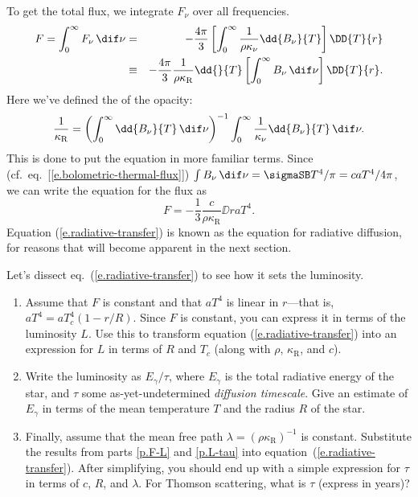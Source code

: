 To get the total flux, we integrate $F_{\nu}$ over all frequencies. 
\begin{eqnarray*}
	F = \int_{0}^{\infty}F_{\nu}\,\dif\nu &=& -\frac{4\pi}{3} \left[\int_{0}^{\infty} \frac{1}{\rho\kappa_{\nu}}\dd{B_{\nu}}{T}\right]\DD{T}{r}\\
	&\equiv& -\frac{4\pi}{3}\frac{1}{\rho\kappa_{\mathrm{R}}}\dd{}{T}\left[\int_{0}^{\infty}B_{\nu}\,\dif\nu\right]\DD{T}{r}.
\end{eqnarray*}
Here we've defined the  of the opacity:
\begin{equation}\label{e.rosseland-opacity}
	\frac{1}{\kappa_{\mathrm{R}}} = \left(\int_{0}^{\infty} \dd{B_{\nu}}{T}\,\dif\nu\right)^{-1}\int_{0}^{\infty} \frac{1}{\kappa_{\nu}}\dd{B_{\nu}}{T}\,\dif\nu.
\end{equation}
This is done to put the equation in more familiar terms. Since (cf.\ eq.~[\ref{e.bolometric-thermal-flux}]) $\int B_{\nu}\,\dif\nu = \sigmaSB T^{4}/\pi = c a T^{4}/4\pi$, we can write the equation for the flux as
\begin{equation}
	F = -\frac{1}{3}\frac{c}{\rho\kappa_{\mathrm{R}}}\DD{}{r}aT^{4}.
\label{e.radiative-transfer}
\end{equation}
Equation (\ref{e.radiative-transfer}) is known as the equation for radiative diffusion, for reasons that will become apparent in the next section.

\begin{exercisebox}
Let's dissect eq.~(\ref{e.radiative-transfer}) to see how it sets the luminosity.  
\begin{enumerate}
\item\label{p.F-L}
Assume that $F$ is constant and that $aT^{4}$ is linear in $r$---that is, $aT^{4} = aT_{c}^{4}(1-r/R)$.  Since $F$ is constant, you can express it in terms of the luminosity $L$.  Use this to transform equation (\ref{e.radiative-transfer}) into an expression for $L$ in terms of $R$ and $T_{c}$ (along with $\rho$, $\kappa_{\mathrm{R}}$, and $c$).

\item\label{p.L-tau}
Write the luminosity as $E_{\gamma}/\tau$, where $E_{\gamma}$ is the total radiative energy of the star, and $\tau$ some as-yet-undetermined \emph{diffusion timescale}.  Give an estimate of $E_{\gamma}$ in terms of the mean temperature $T$ and the radius $R$ of the star.

\item
Finally, assume that the mean free path $\lambda = (\rho\kappa_{\mathrm{R}})^{-1}$ is constant.  Substitute the results from parts \ref{p.F-L} and \ref{p.L-tau} into equation~(\ref{e.radiative-transfer}).  After simplifying, you should end up with a simple expression for $\tau$ in terms of $c$, $R$, and $\lambda$.  For Thomson scattering, what is $\tau$ (express in years)?
\end{enumerate}
\end{exercisebox}

